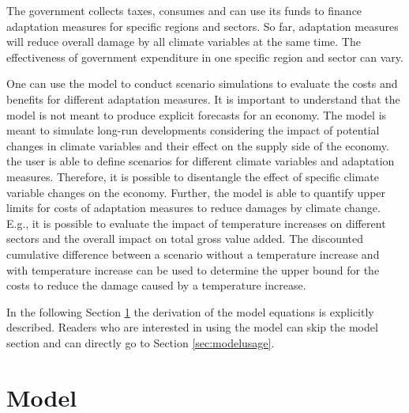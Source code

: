 \documentclass[10pt,a4paper]{article}
\begin{document}
The government collects taxes, consumes and can use its funds to finance adaptation measures for specific regions and sectors. So far, adaptation measures will reduce overall damage by all climate variables at the same time. The effectiveness of government expenditure in one specific region and sector can vary.

One can use the model to conduct scenario simulations to evaluate the costs and benefits for different adaptation measures. It is important to understand that the model is not meant to produce explicit forecasts for an economy. The model is meant to simulate long-run developments considering the impact of potential changes in climate variables and their effect on the supply side of the economy. the user is able to define scenarios for different climate variables and adaptation measures. Therefore, it is possible to disentangle the effect of specific climate variable changes on the economy. Further, the model is able to quantify upper limits for costs of adaptation measures to reduce damages by climate change. E.g., it is possible to evaluate the impact of temperature increases on different sectors and the overall impact on total gross value added. The discounted cumulative difference between a scenario without a temperature increase and with temperature increase can be used to determine the upper bound for the costs to reduce the damage caused by a temperature increase.  

In the following Section \ref{sec:modelderivation} the derivation of the model equations is explicitly described. Readers who are interested in using the model can skip the model section and can directly go to Section \ref{sec:modelusage}.

\cleardoublepage
\section{Model}\label{sec:modelderivation}
\end{document}
